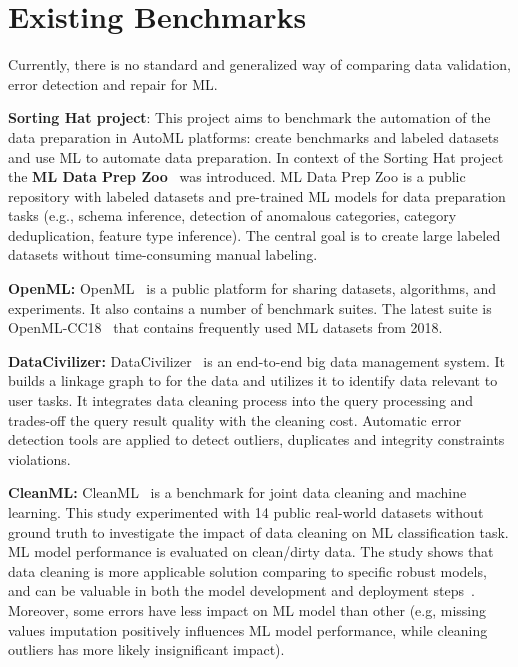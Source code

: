 
\section{Existing Benchmarks}
\label{sec:existing_benchmarks}

Currently, there is no standard and generalized way of comparing data validation, error detection and repair for ML.

\textbf{Sorting Hat project}: 
This project aims to benchmark the automation of the data preparation in AutoML platforms: create benchmarks and labeled datasets and use ML to automate data preparation.
In context of the Sorting Hat project~\cite{sortinghat} the \textbf{ML Data Prep Zoo}~\cite{prepzoo} was introduced.
ML Data Prep Zoo is a public repository with labeled datasets and pre-trained ML models for data preparation tasks (e.g., schema inference, detection of anomalous categories, category deduplication, feature type inference).
The central goal is to create large labeled datasets without time-consuming manual labeling.

\textbf{OpenML:} 
OpenML~\cite{openml_suites} is a public platform for sharing datasets, algorithms, and experiments. It also contains a number of benchmark suites. The latest suite is OpenML-CC18~\cite{openml_suites} that contains frequently used ML datasets from 2018.

\textbf{DataCivilizer:}
DataCivilizer~\cite{datacivil} is an end-to-end big data management system. 
It builds a linkage graph to for the data and utilizes it to identify data relevant to user tasks. 
It integrates data cleaning process into the query processing and trades-off the query result quality with the cleaning cost. 
Automatic error detection tools are applied to detect outliers, duplicates and integrity constraints violations.

\textbf{CleanML:}
CleanML~\cite{cleanml} is a benchmark for joint data cleaning and machine learning.
This study experimented with 14 public real-world datasets without ground truth to investigate the impact of data cleaning on ML classification task. 
ML model performance is evaluated on clean/dirty data.
The study shows that data cleaning is more applicable solution comparing to specific robust models, and can be valuable in both the model development and deployment steps~\cite{cleanml}.
Moreover, some errors have less impact on ML model than other (e.g, missing values imputation positively influences ML model performance, while cleaning outliers has more likely insignificant impact). 


